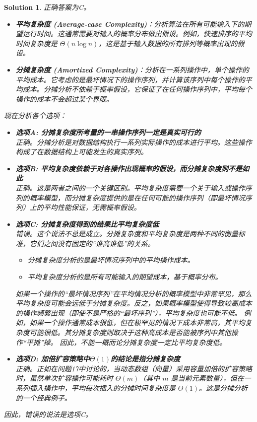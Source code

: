 \documentclass[UTF8]{report}
\newtheorem{solution}{Solution}
\theoremstyle{MyLineTheoremStyle} %
\theoremstyle{MyBlockTheoremStyle} %
\theoremstyle{MySubsubsectionStyle} %
\begin{document}
\begin{solution}
正确答案为C。

\begin{itemize}
    \item \textbf{平均复杂度 (Average-case Complexity)}：分析算法在所有可能输入下的期望运行时间。这通常需要对输入的概率分布做出假设。例如，快速排序的平均时间复杂度是 $\Theta(n\log n)$，这是基于输入数据的所有排列等概率出现的假设。
    \item \textbf{分摊复杂度 (Amortized Complexity)}：分析在一系列操作中，单个操作的平均成本。它考虑的是最坏情况下的操作序列，并计算该序列中每个操作的平均成本。分摊分析不依赖于概率假设，它保证了在任何操作序列中，平均每个操作的成本不会超过某个界限。
\end{itemize}

现在分析各个选项：
\begin{itemize}
    \item \textbf{选项A: 分摊复杂度所考量的一串操作序列一定是真实可行的} \\
    正确。分摊分析是对数据结构执行一系列实际操作的成本进行平均。这些操作构成了在数据结构上可能发生的真实序列。

    \item \textbf{选项B: 平均复杂度依赖于对各操作出现概率的假设，而分摊复杂度则不是如此} \\
    正确。这是两者之间的一个关键区别。平均复杂度需要一个关于输入或操作序列的概率模型，而分摊复杂度提供的是在任何可能的操作序列（即最坏情况序列）上的平均性能保证，无需概率假设。

    \item \textbf{选项C: 分摊复杂度得到的结果比平均复杂度低} \\
    错误。这个说法不总是成立。分摊复杂度和平均复杂度是两种不同的衡量标准，它们之间没有固定的“谁高谁低”的关系。
    \begin{itemize}
        \item 分摊复杂度分析的是最坏情况序列中的平均操作成本。
        \item 平均复杂度分析的是所有可能输入的期望成本，基于概率分布。
    \end{itemize}
    如果一个操作的“最坏情况序列”在平均情况分析的概率模型中非常罕见，那么平均复杂度可能会远低于分摊复杂度。反之，如果概率模型使得导致较高成本的操作频繁出现（即使不是严格的“最坏序列”），平均复杂度也可能不低。
    例如，如果一个操作通常成本很低，但在极罕见的情况下成本非常高，其平均复杂度可能很低。其分摊复杂度则取决于这种高成本是否能被序列中其他操作“平摊”掉。
    因此，不能一概而论分摊复杂度一定比平均复杂度低。

    \item \textbf{选项D: 加倍扩容策略中$\Theta(1)$的结论是指分摊复杂度} \\
    正确。正如在问题17中讨论的，当动态数组（向量）采用容量加倍的扩容策略时，虽然单次扩容操作可能耗时 $\Theta(m)$（其中 $m$ 是当前元素数量），但在一系列插入操作中，平均每次插入的分摊时间复杂度是 $\Theta(1)$。这是分摊分析的一个经典例子。
\end{itemize}
因此，错误的说法是选项C。
\end{solution}
\end{document}
